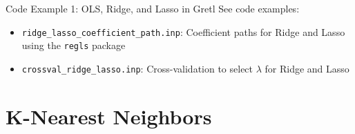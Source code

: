 \documentclass[11pt]{beamer}
\begin{document}





\begin{frame}{Code Example 1: OLS, Ridge, and Lasso in Gretl}
	See code examples:
	\vspace{0.25cm}

	\begin{itemize}
		\setlength{\itemsep}{0.15cm}
		\item \texttt{ridge\_lasso\_coefficient\_path.inp}: Coefficient paths for Ridge and Lasso using the \texttt{regls} package
		\item \texttt{crossval\_ridge\_lasso.inp}: Cross-validation to select $\lambda$ for Ridge and Lasso
	\end{itemize}
\end{frame}


\section{K-Nearest Neighbors}
\end{document}
